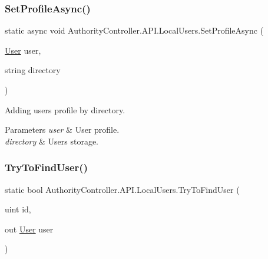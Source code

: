 \subsubsection{\texorpdfstring{Set\+Profile\+Async()}{SetProfileAsync()}}
{\footnotesize\ttfamily static async void Authority\+Controller.\+A\+P\+I.\+Local\+Users.\+Set\+Profile\+Async (\begin{DoxyParamCaption}\item[{\mbox{\hyperlink{class_authority_controller_1_1_data_1_1_personal_1_1_user}{User}}}]{user,  }\item[{string}]{directory }\end{DoxyParamCaption})\hspace{0.3cm}{\ttfamily [static]}}



Adding user\textquotesingle{}s profile by directory. 


\begin{DoxyParams}{Parameters}
{\em user} & User profile.\\
\hline
{\em directory} & Users storage.\\
\hline
\end{DoxyParams}
\mbox{\label{class_authority_controller_1_1_a_p_i_1_1_local_users_a9ce59e22a9d7f732ea20d2579ab57f48}} 
\subsubsection{\texorpdfstring{Try\+To\+Find\+User()}{TryToFindUser()}\hspace{0.1cm}{\footnotesize\ttfamily [1/2]}}
{\footnotesize\ttfamily static bool Authority\+Controller.\+A\+P\+I.\+Local\+Users.\+Try\+To\+Find\+User (\begin{DoxyParamCaption}\item[{uint}]{id,  }\item[{out \mbox{\hyperlink{class_authority_controller_1_1_data_1_1_personal_1_1_user}{User}}}]{user }\end{DoxyParamCaption})\hspace{0.3cm}{\ttfamily [static]}}



